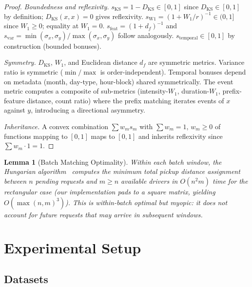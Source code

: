 \documentclass[conference,10pt]{IEEEtran}
\newtheorem{lemma}[theorem]{Lemma}
\begin{document}
\begin{proof}
\emph{Boundedness and reflexivity.}
$s_\text{KS} = 1 - D_\text{KS} \in [0,1]$ since $D_\text{KS} \in [0,1]$
by definition; $D_\text{KS}(x,x) = 0$ gives reflexivity.
$s_\text{W1} = (1 + W_1/r)^{-1} \in (0,1]$ since $W_1 \geq 0$; equality
at $W_1 = 0$. $s_\text{feat} = (1 + d_f)^{-1}$ and $s_\text{var} =
\min(\sigma_x, \sigma_y)/\max(\sigma_x, \sigma_y)$ follow analogously.
$s_\text{temporal} \in [0,1]$ by construction (bounded bonuses).

\emph{Symmetry.}
$D_\text{KS}$, $W_1$, and Euclidean distance $d_f$ are symmetric metrics.
Variance ratio is symmetric ($\min/\max$ is order-independent). Temporal
bonuses depend on metadata (month, day-type, hour-block) shared
symmetrically. The event metric computes a composite of sub-metrics
(intensity-$W_1$, duration-$W_1$, prefix-feature distance, count ratio)
where the prefix matching iterates events of $x$ against $y$, introducing
a directional asymmetry.

\emph{Inheritance.}
A convex combination $\sum w_m s_m$ with $\sum w_m = 1$, $w_m \geq 0$
of functions mapping to $[0,1]$ maps to $[0,1]$ and inherits reflexivity
since $\sum w_m \cdot 1 = 1$.
\end{proof}

\begin{lemma}[Batch Matching Optimality]
\label{lem:hungarian}
Within each batch window, the Hungarian
algorithm~\cite{kuhn1955hungarian} computes the minimum total pickup
distance assignment between $n$ pending requests and $m \geq n$
available drivers in $O(n^2 m)$ time for the rectangular case
(our implementation pads to a square matrix, yielding
$O(\max(n,m)^3)$). This is \emph{within-batch optimal} but myopic: it does not account for future requests that may
arrive in subsequent windows.
\end{lemma}


\section{Experimental Setup}
\label{sec:experiments}

\subsection{Datasets}
\end{document}
